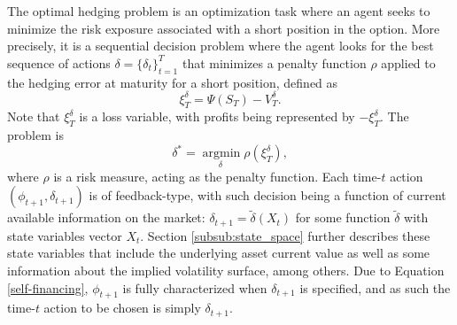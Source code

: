 \documentclass[12pt]{article}
\begin{document}
The optimal hedging problem is an optimization task where an agent seeks to minimize the risk exposure associated with a short position in the option. More precisely, it is a sequential decision problem where the agent looks for the best sequence of actions $\delta= \{ \delta_t\}^T_{t=1}$ that minimizes a penalty function $\rho$ applied to the hedging error at maturity for a short position, defined as 
\begin{equation*}
    \xi_{T}^{\delta} = \Psi(S_{T}) - V_{T}^{\delta}.
\end{equation*}
Note that $\xi_{T}^{\delta}$ is a loss variable, with profits being represented by $-\xi_{T}^{\delta}$.
The problem is
\begin{equation}\label{Hedging_problem}
\delta^{*}=\mathop{\arg \min}\limits_{\delta\ } \rho  \left( \xi_{T}^{\delta} \right) ,
\end{equation}
where $\rho$ is a risk measure, acting as the penalty function. Each time-$t$ action $(\phi_{t+1},\delta_{t+1})$ is of feedback-type, with such decision being a function of current available information on the market: $\delta_{t+1}= \tilde{\delta}(X_t)$ for some function $\tilde{\delta}$ with state variables vector $X_t$. 
Section \ref{subsub:state_space} further describes these state variables that include the underlying asset current value as well as some information about the implied volatility surface, among others. Due to Equation \eqref{self-financing}, $\phi_{t+1}$ is fully characterized when $\delta_{t+1}$ is specified, and as such the time-$t$ action to be chosen is simply $\delta_{t+1}$.
\end{document}
